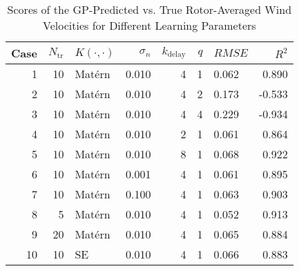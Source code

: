 \begin{table}[!ht]
\centering
\caption{Scores of the \ac{GP}-Predicted vs. True Rotor-Averaged Wind Velocities for Different Learning Parameters}
\label{tab:scores}
\begin{tabular}{rrlrrrlr}
\toprule
 Case &  $N_\text{tr}$ & $K(\cdot, \cdot)$ &  $\sigma_n$ &  $k_\text{delay}$ &  $q$ &                  $RMSE$ &  $R^2$ \\
\midrule
    1 &             10 &          Mat\'ern &       0.010 &                 4 &    1 &  \cellcolor{Gray7}0.062 &  0.890 \\
    2 &             10 &          Mat\'ern &       0.010 &                 4 &    2 &  \cellcolor{Gray2}0.173 & -0.533 \\
    3 &             10 &          Mat\'ern &       0.010 &                 4 &    4 &  \cellcolor{Gray1}0.229 & -0.934 \\
    4 &             10 &          Mat\'ern &       0.010 &                 2 &    1 &  \cellcolor{Gray9}0.061 &  0.864 \\
    5 &             10 &          Mat\'ern &       0.010 &                 8 &    1 &  \cellcolor{Gray3}0.068 &  0.922 \\
    6 &             10 &          Mat\'ern &       0.001 &                 4 &    1 &  \cellcolor{Gray8}0.061 &  0.895 \\
    7 &             10 &          Mat\'ern &       0.100 &                 4 &    1 &  \cellcolor{Gray6}0.063 &  0.903 \\
    8 &              5 &          Mat\'ern &       0.010 &                 4 &    1 & \cellcolor{Gray10}0.052 &  0.913 \\
    9 &             20 &          Mat\'ern &       0.010 &                 4 &    1 &  \cellcolor{Gray5}0.065 &  0.884 \\
   10 &             10 &                SE &       0.010 &                 4 &    1 &  \cellcolor{Gray4}0.066 &  0.883 \\
\bottomrule
\end{tabular}
\end{table}
